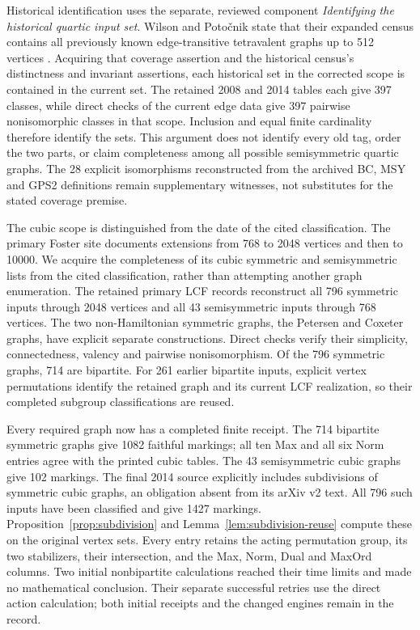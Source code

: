 \documentclass[11pt]{article}
\theoremstyle{definition}\newtheorem{definition}[theorem]{Definition}
\begin{document}
Historical identification uses the separate, reviewed component
\emph{Identifying the historical quartic input set}.  Wilson and
Poto\v cnik state that their expanded census contains all previously
known edge-transitive tetravalent graphs up to 512 vertices
\cite[\S1]{Recipes}.  Acquiring that coverage assertion and the
historical census's distinctness and invariant assertions, each
historical set in the corrected scope is contained in the current
set.  The retained 2008 and 2014 tables each give 397 classes, while
direct checks of the current edge data give 397 pairwise
nonisomorphic classes in that scope.  Inclusion and equal finite
cardinality therefore identify the sets.  This argument does not
identify every old tag, order the two parts, or claim completeness
among all possible semisymmetric quartic graphs.  The 28 explicit
isomorphisms reconstructed from the archived BC, MSY and GPS2
definitions remain supplementary witnesses, not substitutes for
the stated coverage premise.

The cubic scope is distinguished from the date of the cited
classification.  The primary Foster site documents extensions from
768 to 2048 vertices and then to 10000.  We acquire the completeness
of its cubic symmetric and semisymmetric lists from the cited
classification, rather than attempting another graph enumeration.
The retained primary LCF records reconstruct all 796 symmetric
inputs through 2048 vertices and all 43 semisymmetric inputs through
768 vertices.  The two non-Hamiltonian symmetric graphs, the Petersen
and Coxeter graphs, have explicit separate constructions.  Direct
checks verify their simplicity, connectedness, valency and pairwise
nonisomorphism.  Of the 796 symmetric graphs, 714 are bipartite.
For 261 earlier bipartite inputs, explicit vertex permutations identify
the retained graph and its current LCF realization, so their completed
subgroup classifications are reused.

Every required graph now has a completed finite receipt.  The 714
bipartite symmetric graphs give 1082 faithful markings; all ten Max
and all six Norm entries agree with the printed cubic tables.
The 43 semisymmetric cubic graphs give 102 markings.  The final 2014
source explicitly includes subdivisions of symmetric cubic graphs,
an obligation absent from its arXiv v2 text.  All 796 such inputs
have been classified and give 1427 markings.  Proposition~\ref{prop:subdivision}
and Lemma~\ref{lem:subdivision-reuse} compute these on the original
vertex sets.  Every entry retains the acting permutation group,
its two stabilizers, their intersection, and the Max, Norm, Dual
and MaxOrd columns.  Two initial nonbipartite calculations reached
their time limits and made no mathematical conclusion.  Their
separate successful retries use the direct action calculation; both
initial receipts and the changed engines remain in the record.
\end{document}
